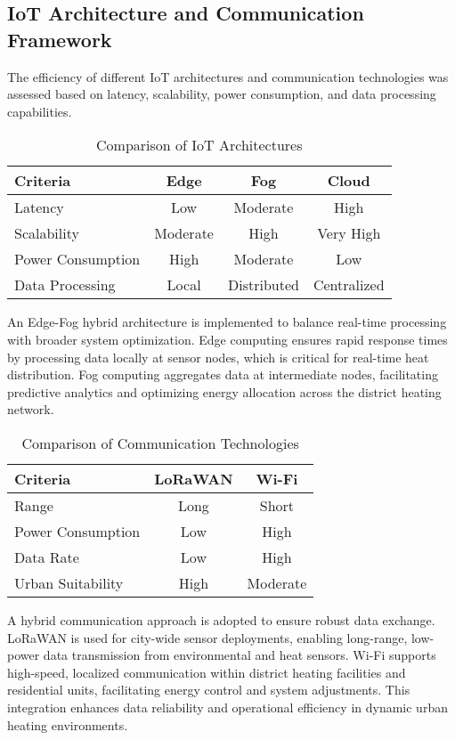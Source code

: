 \documentclass[conference]{IEEEtran}
\begin{document}
\subsection{IoT Architecture and Communication Framework}

The efficiency of different IoT architectures and communication technologies was assessed based on latency, scalability, power consumption, and data processing capabilities.

\begin{table}[h]
\centering
\caption{Comparison of IoT Architectures}
\begin{tabular}{|l|c|c|c|}
\hline
\textbf{Criteria} & \textbf{Edge} & \textbf{Fog} & \textbf{Cloud} \\
\hline
Latency & Low & Moderate & High \\
Scalability & Moderate & High & Very High \\
Power Consumption & High & Moderate & Low \\
Data Processing & Local & Distributed & Centralized \\
\hline
\end{tabular}
\end{table}

An Edge-Fog hybrid architecture is implemented to balance real-time processing with broader system optimization. Edge computing ensures rapid response times by processing data locally at sensor nodes, which is critical for real-time heat distribution. Fog computing aggregates data at intermediate nodes, facilitating predictive analytics and optimizing energy allocation across the district heating network.

\begin{table}[h]
\centering
\caption{Comparison of Communication Technologies}
\begin{tabular}{|l|c|c|}
\hline
\textbf{Criteria} & \textbf{LoRaWAN} & \textbf{Wi-Fi} \\
\hline
Range & Long & Short \\
Power Consumption & Low & High \\
Data Rate & Low & High \\
Urban Suitability & High & Moderate \\
\hline
\end{tabular}
\end{table}

A hybrid communication approach is adopted to ensure robust data exchange. LoRaWAN is used for city-wide sensor deployments, enabling long-range, low-power data transmission from environmental and heat sensors. Wi-Fi supports high-speed, localized communication within district heating facilities and residential units, facilitating energy control and system adjustments. This integration enhances data reliability and operational efficiency in dynamic urban heating environments.
\end{document}
